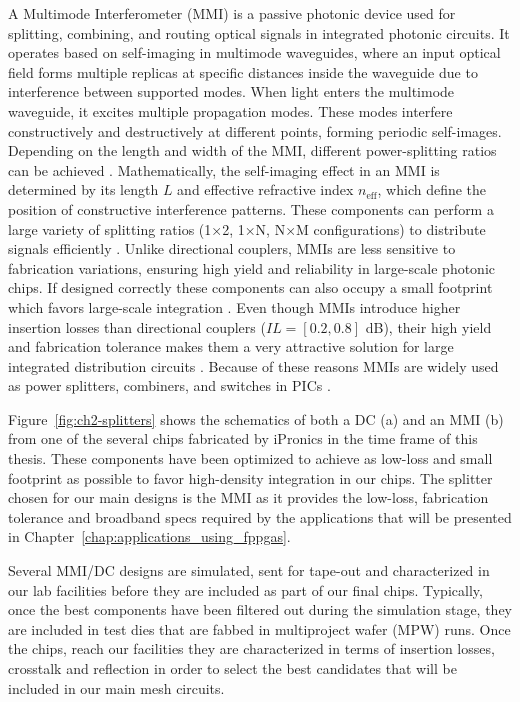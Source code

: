 A Multimode Interferometer (MMI) is a passive photonic device used for splitting, combining, and routing optical signals in integrated photonic circuits.
It operates based on self-imaging in multimode waveguides, where an input optical field forms multiple replicas at specific distances inside the waveguide due to interference between supported modes.
When light enters the multimode waveguide, it excites multiple propagation modes.
These modes interfere constructively and destructively at different points, forming periodic self-images.
Depending on the length and width of the MMI, different power-splitting ratios can be achieved \cite{soldano_optical_1995,sheng_compact_2012}.
Mathematically, the self-imaging effect in an MMI is determined by its length \( L \) and effective refractive index \( n_{\text{eff}} \), which define the position of constructive interference patterns.
These components can perform a large variety of splitting ratios (1×2, 1×N, N×M configurations) to distribute signals efficiently \cite{hosseini_1_2011}.
Unlike directional couplers, MMIs are less sensitive to fabrication variations, ensuring high yield and reliability in large-scale photonic chips.
If designed correctly these components can also occupy a small footprint which favors large-scale integration \cite{kim_experimental_2022}.
Even though MMIs introduce higher insertion losses than directional couplers (\(IL = [0.2, 0.8]\) dB), their high yield and fabrication tolerance makes them a very attractive solution for large integrated distribution circuits \cite{darmawan_rigorous_2005}.
Because of these reasons MMIs are widely used as power splitters, combiners, and switches in PICs \cite{song_low-loss_2022}.

Figure~\ref{fig:ch2-splitters} shows the schematics of both a DC (a) and an MMI (b) from one of the several chips fabricated by iPronics in the time frame of this thesis.
These components have been optimized to achieve as low-loss and small footprint as possible to favor high-density integration in our chips.
The splitter chosen for our main designs is the MMI as it provides the low-loss, fabrication tolerance and broadband specs required by the applications that will be presented in Chapter~\ref{chap:applications_using_fppgas}.

Several MMI/DC designs are simulated, sent for tape-out and characterized in our lab facilities before they are included as part of our final chips.
Typically, once the best components have been filtered out during the simulation stage, they are included in test dies that are fabbed in multiproject wafer (MPW) runs.
Once the chips, reach our facilities they are characterized in terms of insertion losses, crosstalk and reflection in order to select the best candidates that will be included in our main mesh circuits.

